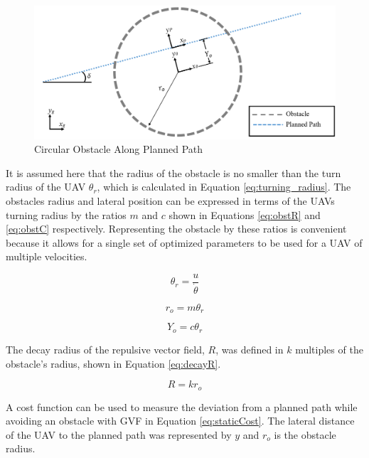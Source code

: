 \documentclass[numbered,pdftex]{ohio-etd}
\begin{document}
\begin{figure}[H]
	\centering
	\includegraphics[width=14cm]{Figures/methods/obstacleOnPath}
	\caption{Circular Obstacle Along Planned Path}
	\label{fig:obstacleonpath}
\end{figure}

 It is assumed here that the radius of the obstacle is no smaller than the turn radius of the UAV $\theta_r$, which is calculated in Equation \ref{eq:turning_radius}. The obstacles radius and lateral position can be expressed in terms of the UAVs turning radius by the ratios $m$ and $c$ shown in Equations \ref{eq:obstR} and \ref{eq:obstC} respectively. Representing the obstacle by these ratios is convenient because it allows for a single set of optimized parameters to be used for a UAV of multiple velocities. 
 


\begin{equation}
\label{eq:turning_radius}
\theta_r = \frac{u}{\dot{\theta}}
\end{equation}

\begin{equation}
\label{eq:obstR}
r_o = m \theta_r
\end{equation}

\begin{equation}
\label{eq:obstC}
Y_o = c \theta_r
\end{equation}

The decay radius of the repulsive vector field, $R$, was defined in $k$ multiples of the obstacle's radius, shown in Equation \ref{eq:decayR}. 
 
 \begin{equation}
 \label{eq:decayR}
 R = k r_o
 \end{equation}
 
 

 A cost function can be used to measure the deviation from a planned path while avoiding an obstacle with GVF in Equation \ref{eq:staticCost}. The lateral distance of the UAV to the planned path was represented by $y$ and $r_o$ is the obstacle radius.
 
\end{document}
